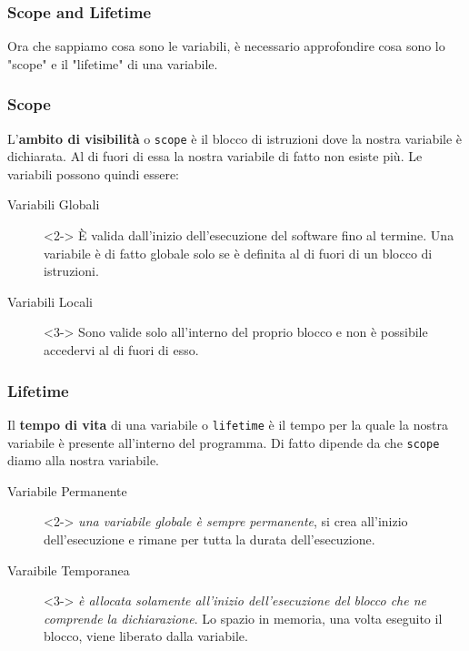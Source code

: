 \documentclass{beamer}
\begin{document}
    \begin{frame}
        \frametitle{Scope and Lifetime}
        Ora che sappiamo cosa sono le variabili, è necessario approfondire cosa sono lo "scope" e il "lifetime" di una variabile.
    \end{frame}

    \begin{frame}
        \frametitle{Scope}
        L'\textbf{ambito di visibilità} o \texttt{scope} è il blocco di istruzioni dove la nostra variabile è dichiarata. Al di fuori di essa la nostra variabile di fatto non esiste più. Le variabili possono quindi essere:
        \begin{description}
            \item[Variabili Globali]<2-> È valida dall'inizio dell'esecuzione del software fino al termine. Una variabile è di fatto globale solo se è definita al di fuori di un blocco di istruzioni.
            \item[Variabili Locali]<3-> Sono valide solo all'interno del proprio blocco e non è possibile accedervi al di fuori di esso. 
        \end{description}
    \end{frame}

    \begin{frame}
        \frametitle{Lifetime}
        Il \textbf{tempo di vita} di una variabile o \texttt{lifetime} è il tempo per la quale la nostra variabile è presente all'interno del programma. Di fatto dipende da che \texttt{scope} diamo alla nostra variabile.
        \begin{description}
            \item[Variabile Permanente]<2-> \textit{una variabile globale è sempre permanente}, si crea all'inizio dell'esecuzione e rimane per tutta la durata dell'esecuzione.
            \item[Varaibile Temporanea]<3-> \textit{è allocata solamente all'inizio dell'esecuzione del blocco che ne comprende la dichiarazione}. Lo spazio in memoria, una volta eseguito il blocco, viene liberato dalla variabile.
        \end{description}
    \end{frame}
\end{document}
